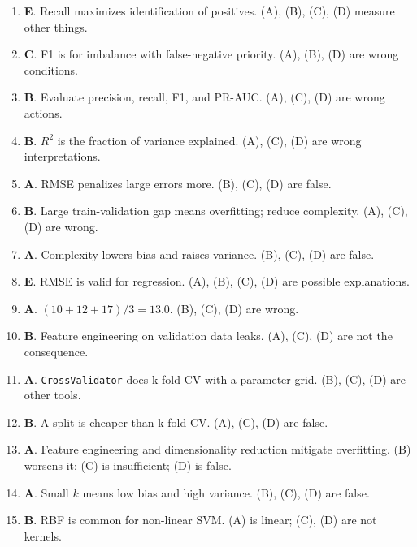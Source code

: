 \documentclass[11pt]{article}
\begin{document}
\begin{enumerate}[leftmargin=*, label=\textbf{Q\arabic*.}]
		\item \textbf{E}. Recall maximizes identification of positives. (A), (B), (C), (D) measure other things.
		
		\item \textbf{C}. F1 is for imbalance with false-negative priority. (A), (B), (D) are wrong conditions.
		
		\item \textbf{B}. Evaluate precision, recall, F1, and PR-AUC. (A), (C), (D) are wrong actions.
		
		\item \textbf{B}. $R^2$ is the fraction of variance explained. (A), (C), (D) are wrong interpretations.
		
		\item \textbf{A}. RMSE penalizes large errors more. (B), (C), (D) are false.
		
		\item \textbf{B}. Large train-validation gap means overfitting; reduce complexity. (A), (C), (D) are wrong.
		
		\item \textbf{A}. Complexity lowers bias and raises variance. (B), (C), (D) are false.
		
		\item \textbf{E}. RMSE is valid for regression. (A), (B), (C), (D) are possible explanations.
		
		\item \textbf{A}. $(10+12+17)/3 = 13.0$. (B), (C), (D) are wrong.
		
		\item \textbf{B}. Feature engineering on validation data leaks. (A), (C), (D) are not the consequence.
		
		\item \textbf{A}. \texttt{CrossValidator} does k-fold CV with a parameter grid. (B), (C), (D) are other tools.
		
		\item \textbf{B}. A split is cheaper than k-fold CV. (A), (C), (D) are false.
		
		\item \textbf{A}. Feature engineering and dimensionality reduction mitigate overfitting. (B) worsens it; (C) is insufficient; (D) is false.
		
		\item \textbf{A}. Small $k$ means low bias and high variance. (B), (C), (D) are false.
		
		\item \textbf{B}. RBF is common for non-linear SVM. (A) is linear; (C), (D) are not kernels.
		

\end{enumerate}
\end{document}
